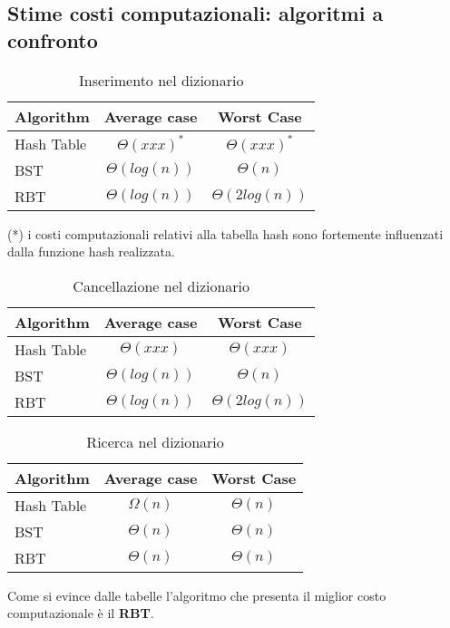 \documentclass[paper=a4, fontsize=11pt,twoside]{scrartcl}   %
\begin{document}
			\subsection{Stime costi computazionali: algoritmi a confronto}				
				\begin{table}[ht]	
					\centering									
					\begin{tabular}{l | c | c}						
						Algorithm & Average case & Worst Case \\
						\hline
						Hash Table & $\Theta(xxx)^*$ & $\Theta(xxx)^*$ \\
						\hline
						BST & $\Theta(log(n))$ & $\Theta(n)$ \\
						\hline
						RBT & $\Theta(log(n))$ & $\Theta(2log(n))$ \\
						\hline					
					\end{tabular}
					\caption{Inserimento nel dizionario} %
				\end{table}	
				\noindent(*) i costi computazionali relativi alla tabella hash sono fortemente influenzati dalla funzione hash realizzata.
				\begin{table}[ht]
					\centering									
					\begin{tabular}{l | c | c}
						
						Algorithm & Average case & Worst Case \\
						\hline
						Hash Table & $\Theta(xxx)$ & $\Theta(xxx)$ \\
						\hline
						BST & $\Theta(log(n))$ & $\Theta(n)$ \\
						\hline
						RBT & $\Theta(log(n))$ & $\Theta(2log(n))$ \\
						\hline					
					\end{tabular}
					\caption{Cancellazione nel dizionario} %
				\end{table}
						
				\begin{table}[ht]
					\centering									
					\begin{tabular}{l | c | c}
						
						Algorithm & Average case & Worst Case \\
						\hline
						Hash Table & $\Omega(n)$ & $\Theta(n)$ \\
						\hline
						BST & $\Theta(n)$ & $\Theta(n)$ \\
						\hline
						RBT & $\Theta(n)$ & $\Theta(n)$ \\
						\hline					
					\end{tabular}
					\caption{Ricerca nel dizionario} %
				\end{table}
			 \noindent Come si evince dalle tabelle l'algoritmo che presenta il miglior costo computazionale è il \textbf{RBT}.
			 \pagebreak
			 
\end{document}
